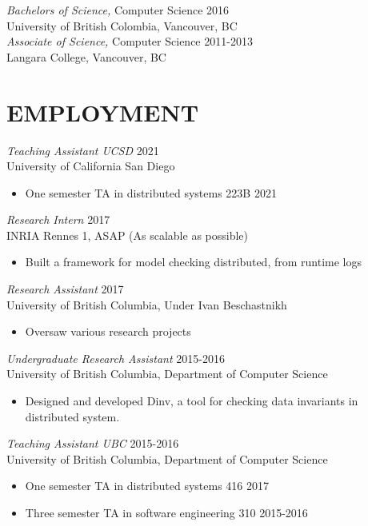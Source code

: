 \documentclass[line,margin]{res}
\begin{document}
\begin{resume}
{\sl Bachelors of Science,} Computer Science	\hfill 2016\\
University of British Colombia, Vancouver, BC \\

{\sl Associate of Science,} Computer Science \hfill 2011-2013\\
Langara College, Vancouver, BC\\

\pagebreak

\section{EMPLOYMENT} 

{\sl Teaching Assistant UCSD} \hfill 2021\\
	University of California San Diego
\begin{itemize} \itemsep -2pt
        \item One semester TA in distributed systems 223B \hfill 2021
	\end{itemize}

{\sl Research Intern} \hfill 2017\\
    INRIA Rennes 1, ASAP (As scalable as possible)
\begin{itemize} \itemsep -2pt
        \item Built a framework for model checking distributed, from runtime logs
    \end{itemize}

{\sl Research Assistant} \hfill 2017\\
    University of British Columbia, Under Ivan Beschastnikh
\begin{itemize} \itemsep -2pt
        \item Oversaw various research projects
    \end{itemize}

{\sl Undergraduate Research Assistant} \hfill 2015-2016\\
	University of British Columbia, Department of Computer Science
\begin{itemize} \itemsep -2pt
        \item Designed and developed Dinv, a tool for checking data invariants in distributed system.
    \end{itemize}

{\sl Teaching Assistant UBC} \hfill 2015-2016\\
	University of British Columbia, Department of Computer Science
\begin{itemize} \itemsep -2pt
        \item One semester TA in distributed systems 416 \hfill 2017
		\item Three semester TA in software engineering 310 \hfill 2015-2016\\
	\end{itemize}


\end{resume}
\end{document}
